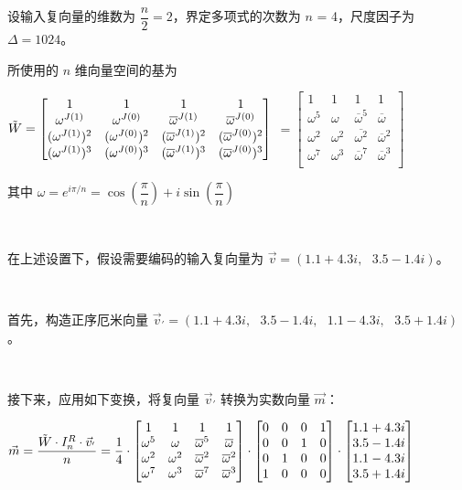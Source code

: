 设输入复向量的维数为 $\dfrac{n}{2} = 2$，界定多项式的次数为 $n$ = 4，尺度因子为 $\Delta = 1024$。

所使用的 $n$ 维向量空间的基为

$\tilde{W}= \begin{bmatrix}
1 & 1 & 1 & 1\\
\omega^{J(1)} & \omega^{J(0)} & \overline{\omega}^{J(1)} & \overline{\omega}^{J(0)}\\
(\omega^{J(1)})^2 & ({\omega^{J(0)}})^2 & (\overline{\omega}^{J(1)})^2 & (\overline{\omega}^{J(0)})^2\\
(\omega^{J(1)})^3 & (\omega^{J(0)})^3 & (\overline{\omega}^{J(1)})^3 & (\overline{\omega}^{J(0)})^3\\
\end{bmatrix}$
$= \begin{bmatrix}
1 & 1 & 1 & 1\\
\omega^5 & \omega & \overline{\omega}^5 & \overline{\omega}\\
\omega^2 & \omega^2 & \overline{\omega^2} & \overline{\omega}^2\\
\omega^7 & \omega^3 & \overline{\omega}^7 & \overline{\omega}^3\\
\end{bmatrix}$

其中 $\omega = e^{i\pi/n} = \cos \left(\dfrac{\pi}{n}\right) + i\sin \left(\dfrac{\pi}{n}\right)$

$ $


在上述设置下，假设需要编码的输入复向量为 $\vec{v} = (1.1 + 4.3i, \text{ } 3.5 - 1.4i)$。

$ $

首先，构造正序厄米向量 $\vec{v}_{'} = (1.1 + 4.3i, \text{ } 3.5 - 1.4i, \text{ } 1.1 - 4.3i, \text{ } 3.5 + 1.4i)$。

$ $

接下来，应用如下变换，将复向量 $\vec{v}_{'}$ 转换为实数向量 $\vec{m}$：


$\vec{m} = \dfrac{\tilde{W} \cdot I_n^R \cdot \vec{v}_{'}}{n} = \dfrac{1}{4} \cdot \begin{bmatrix}
1 & 1 & 1 & 1\\
\omega^5 & \omega & \overline{\omega}^5 & \overline{\omega}\\
\omega^2 & \omega^2 & \overline{\omega}^2 & \overline{\omega}^2\\
\omega^7 & \omega^3 & \overline{\omega}^7 & \overline{\omega}^3\\
\end{bmatrix} \cdot
\begin{bmatrix}
0 & 0 & 0 & 1 \\
0 & 0 & 1 & 0 \\
0 & 1 & 0 & 0 \\
1 & 0 & 0 & 0
\end{bmatrix}
\cdot
\begin{bmatrix} 1.1 + 4.3i\\3.5 - 1.4i\\1.1 - 4.3i\\3.5 + 1.4i \end{bmatrix}$

